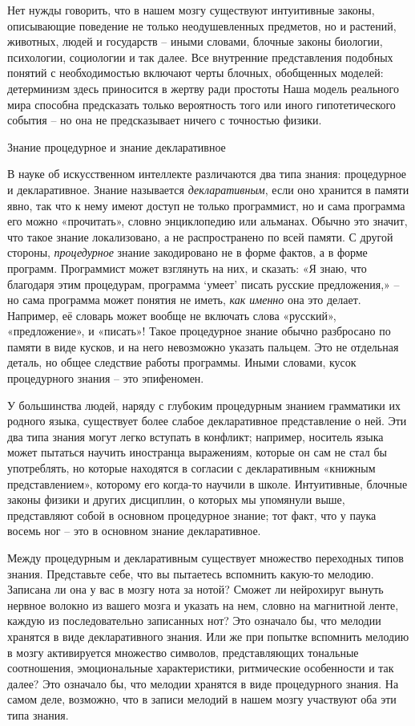 \documentclass[../main.tex]{subfiles}
\begin{document}
Нет нужды говорить, что в нашем мозгу существуют интуитивные законы, описывающие поведение не только неодушевленных предметов, но и растений, животных, людей и государств \--- иными словами, блочные законы биологии, психологии, социологии и так далее. Все внутренние представления подобных понятий с необходимостью включают черты блочных, обобщенных моделей: детерминизм здесь приносится в жертву ради простоты Наша модель реального мира способна предсказать только вероятность того или иного гипотетического события \--- но она не предсказывает ничего с точностью физики.

Знание процедурное и знание декларативное

В науке об искусственном интеллекте различаются два типа знания: процедурное и декларативное. Знание называется \emph{декларативным}, если оно хранится в памяти явно, так что к нему имеют доступ не только программист, но и сама программа его можно «прочитать», словно энциклопедию или альманах. Обычно это значит, что такое знание локализовано, а не распространено по всей памяти. С другой стороны, \emph{процедурное} знание закодировано не в форме фактов, а в форме программ. Программист может взглянуть на них, и сказать: «Я знаю, что благодаря этим процедурам, программа \enquote*{умеет} писать русские предложения,» \--- но сама программа может понятия не иметь, \emph{как именно} она это делает. Например, её словарь может вообще не включать слова «русский», «предложение», и «писать»! Такое процедурное знание обычно разбросано по памяти в виде кусков, и на него невозможно указать пальцем. Это не отдельная деталь, но общее следствие работы программы. Иными словами, кусок процедурного знания \--- это эпифеномен.

У большинства людей, наряду с глубоким процедурным знанием грамматики их родного языка, существует более слабое декларативное представление о ней. Эти два типа знания могут легко вступать в конфликт; например, носитель языка может пытаться научить иностранца выражениям, которые он сам не стал бы употреблять, но которые находятся в согласии с декларативным «книжным представлением», которому его когда-то научили в школе. Интуитивные, блочные законы физики и других дисциплин, о которых мы упомянули выше, представляют собой в основном процедурное знание; тот факт, что у паука восемь ног \--- это в основном знание декларативное.

Между процедурным и декларативным существует множество переходных типов знания. Представьте себе, что вы пытаетесь вспомнить какую-то мелодию. Записана ли она у вас в мозгу нота за нотой? Сможет ли нейрохируг вынуть нервное волокно из вашего мозга и указать на нем, словно на магнитной ленте, каждую из последовательно записанных нот? Это означало бы, что мелодии хранятся в виде декларативного знания. Или же при попытке вспомнить мелодию в мозгу активируется множество символов, представляющих тональные соотношения, эмоциональные характеристики, ритмические особенности и так далее? Это означало бы, что мелодии хранятся в виде процедурного знания. На самом деле, возможно, что в записи мелодий в нашем мозгу участвуют оба эти типа знания.
\end{document}
